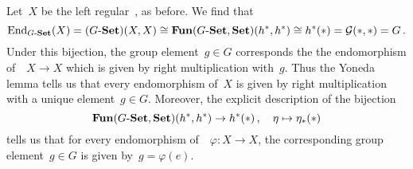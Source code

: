 \subsection{}

Let~$X$ be the left regular~, as before.
We find that
\[
        \operatorname{End}_{\text{$G$-$\mathbf{Set}$}}(X)
  =     (\text{$G$-$\mathbf{Set}$})(X,X)
  \cong \mathbf{Fun}(\text{$G$-$\mathbf{Set}$}, \mathbf{Set})(h^\ast, h^\ast)
  \cong h^\ast(\ast)
  =     \mathcal{G}(\ast,\ast)
  =     G \,.
\]
Under this bijection, the group element~$g \in G$ corresponds the the endomorphism of~~$X \to X$ which is given by right multiplication with~$g$.
Thus the Yoneda lemma tells us that every endomorphism of~$X$ is given by right multiplication with a unique element~$g \in G$.
Moreover, the explicit description of the bijection
\[
          \mathbf{Fun}(\text{$G$-$\mathbf{Set}$}, \mathbf{Set})(h^\ast, h^\ast)
  \to     h^\ast(\ast) \,,
  \quad   \eta
  \mapsto \eta_\ast(\ast)
\]
tells us that for every endomorphism of~~$\varphi \colon X \to X$, the corresponding group element~$g \in G$ is given by~$g = \varphi(e)$.




